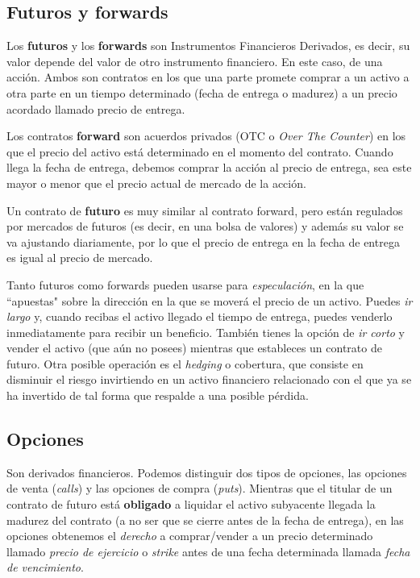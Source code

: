 \subsection{Futuros y forwards}
Los \textbf{futuros} y los \textbf{forwards} son Instrumentos Financieros Derivados, es decir, su valor depende del valor de otro instrumento financiero. En este caso, de una acción. Ambos son contratos en los que una parte promete comprar a un activo a otra parte en un tiempo determinado (fecha de entrega o madurez) a un precio acordado llamado precio de entrega. 

Los contratos \textbf{forward} son acuerdos privados (OTC o \textit{Over The Counter}) en los que
el precio del activo está determinado en el momento del contrato. Cuando llega la fecha de entrega, debemos comprar la acción al precio de entrega, sea este mayor o menor que el precio actual de mercado de la acción.

Un contrato de \textbf{futuro} es muy similar al contrato forward, pero están regulados por mercados de futuros (es decir, en una bolsa de valores) y además su valor se va ajustando diariamente, por lo que el precio de entrega en la fecha de entrega es igual al precio de mercado.

Tanto futuros como forwards pueden usarse para \textit{especulación}, en la que ``apuestas"  sobre la dirección en la que se moverá el precio de un activo. Puedes \textit{ir largo} y, cuando recibas el activo llegado el tiempo de entrega, puedes venderlo inmediatamente para recibir un beneficio. También tienes la opción de \textit{ir corto} y vender el activo (que aún no posees) mientras que estableces un contrato de futuro.
Otra posible operación es el \textit{hedging} o cobertura, que consiste en disminuir el riesgo invirtiendo en un activo financiero relacionado con el que ya se ha invertido de tal forma que respalde a una posible pérdida. 

\subsection{Opciones}
Son derivados financieros. Podemos distinguir dos tipos de opciones, las opciones de venta (\textit{calls}) y las opciones de compra (\textit{puts}). Mientras que el titular de un contrato de futuro está \textbf{obligado} a liquidar el activo subyacente llegada la madurez del contrato (a no ser que se cierre antes de la fecha de entrega), en las opciones obtenemos el \textit{derecho} a comprar/vender a un precio determinado llamado \textit{precio de ejercicio} o \textit{strike} antes de una fecha determinada llamada \textit{fecha de vencimiento}.

